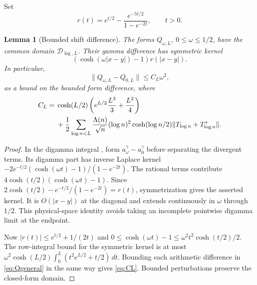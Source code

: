 \documentclass[11pt]{article}
\numberwithin{equation}{section}
\newtheorem{lemma}[theorem]{Lemma}
\theoremstyle{definition}
\theoremstyle{remark}
\newcommand{\DD}{\mathcal D}
\newcommand{\norm}[1]{\lVert#1\rVert}
\begin{document}
Set
\begin{equation}\label{eq:rkernel}
 r(t)=e^{t/2}-\frac{e^{-5t/2}}{1-e^{-2t}},\qquad t>0.
\end{equation}
\begin{lemma}[Bounded shift difference]\label{lem:change}
The forms $Q_{\omega,L}$, $0\le\omega\le1/2$, have the common domain
$\DD_{\log,L}$. Their gamma difference has symmetric kernel
\[
 (\cosh(\omega|x-y|)-1)r(|x-y|).
\]
In particular,
\begin{equation}\label{eq:changebound}
 \norm{Q_{\omega,L}-Q_{0,L}}\le C_L\omega^2,
\end{equation}
as a bound on the bounded form difference, where
\begin{align}
 C_L={}&\cosh(L/2)\left(e^{L/2}\frac{L^3}{3}+\frac{L^2}{4}\right)\notag\\
 &+\frac12\sum_{\log n<L}\frac{\Lambda(n)}{\sqrt n}
 (\log n)^2\cosh(\log n/2)\norm{T_{\log n}+T_{\log n}^*}.
 \label{eq:CL}
\end{align}
\end{lemma}
\begin{proof}
In the digamma integral \cite[\S5.9]{DLMF}, form
$a^\gamma_\omega-a^\gamma_0$ before separating the divergent terms. Its
digamma part has inverse Laplace kernel
$-2e^{-t/2}(\cosh(\omega t)-1)/(1-e^{-2t})$.
The rational terms contribute
$4\cosh(t/2)(\cosh(\omega t)-1)$.
Since
$2\cosh(t/2)-e^{-t/2}/(1-e^{-2t})=r(t)$,
symmetrization gives the asserted kernel. It is $O(|x-y|)$ at the diagonal
and extends continuously in $\omega$ through $1/2$. This physical-space
identity avoids taking an incomplete pointwise digamma limit at the endpoint.

Now $|r(t)|\le e^{t/2}+1/(2t)$ and
$0\le\cosh(\omega t)-1\le\omega^2t^2\cosh(t/2)/2$.
The row-integral bound for the symmetric kernel is at most
$\omega^2\cosh(L/2)\int_0^L(t^2e^{L/2}+t/2)\,dt$.
Bounding each arithmetic difference in \eqref{eq:Qgeneral} in the same
way gives \eqref{eq:CL}. Bounded perturbations preserve the closed-form
domain.
\end{proof}
\end{document}
